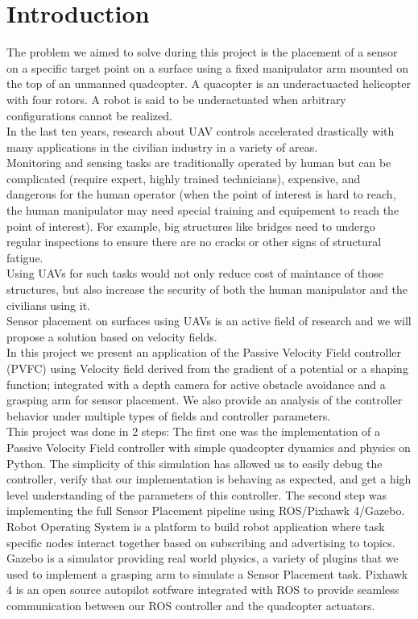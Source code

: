 \section{Introduction}
The problem we aimed to solve during this project is the placement of a sensor on a specific target point on a surface using a fixed manipulator arm mounted on the top of an unmanned quadcopter.
A quacopter is an underactuacted helicopter with four rotors. A robot is said to be underactuated when arbitrary configurations cannot be realized.\\
In the last ten years, research about UAV controls accelerated drastically with many applications in the civilian industry in a variety of areas.\\
Monitoring and sensing tasks are traditionally operated by human but can be complicated (require expert, highly trained technicians), expensive,  and dangerous for the human operator (when the point of interest is hard to reach, the human manipulator may need special training and equipement to reach the point of interest). For example, big structures like bridges need to undergo regular inspections to ensure there are no cracks or other signs of structural fatigue.\\
Using UAVs for such tasks would not only reduce cost of maintance of those structures, but also increase the security of both the human manipulator and the civilians using it. \\
Sensor placement on surfaces using UAVs  is an active field of research and we will propose a solution based on velocity fields.\\
In this project we present an application of the Passive Velocity Field controller (PVFC) using Velocity field derived from the gradient of a potential or a shaping function; integrated with a depth camera for active obstacle avoidance and a grasping arm for sensor placement. We also provide an analysis of the controller behavior under multiple types of fields and controller parameters.\\
This project was done in 2 steps: The first one was the implementation of a Passive Velocity Field controller with simple quadcopter dynamics and physics on Python. The simplicity of this simulation has allowed us to easily debug the controller, verify that our implementation is behaving as expected, and get a high level understanding of the parameters of this controller. 
The second step was implementing the full Sensor Placement pipeline using ROS/Pixhawk 4/Gazebo. Robot Operating System is a platform to build robot application where task specific nodes interact together based on subscribing and advertising to topics. Gazebo is a simulator providing real world physics, a variety of plugins that we used to implement a grasping arm to simulate a Sensor Placement task. Pixhawk 4 is an open source autopilot sotfware integrated with ROS to provide seamless communication between our ROS controller and the quadcopter actuators.
